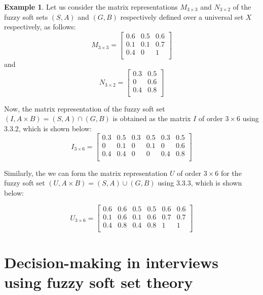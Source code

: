 \documentclass{article}
\theoremstyle{definition}
\newtheorem{example}{Example}[section]
\begin{document}
  \begin{example}
      Let us consider the matrix representations $M_{3\times 3}$ and $N_{3\times 2}$ of the fuzzy soft sets $(S,A)$ and $(G,B)$ respectively defined over a universal set $X$ respectively, as follows:
\[
    M_{3\times 3}=
    \begin{bmatrix}
        0.6 & 0.5 & 0.6 \\
          0.1 & 0.1 & 0.7 \\
           0.4 & 0 & 1 \\
     \end{bmatrix}
     \] and
     \[
    N_{3\times 2}=
    \begin{bmatrix}
        0.3 & 0.5 \\
          0 & 0.6 \\
          0.4 & 0.8 \\
     \end{bmatrix}
     \]
    
      Now, the matrix representation of the fuzzy soft set $(I,A\times B)=(S,A)\cap (G,B)$ is obtained as the matrix $I$ of order $3\times 6$ using 3.3.2, which is shown below:
 \[
    I_{3\times 6}=
    \begin{bmatrix}
        0.3 & 0.5 & 0.3 & 0.5 & 0.3 & 0.5\\
          0 & 0.1 & 0 & 0.1 & 0 & 0.6\\
          0.4 & 0.4 & 0 & 0 & 0.4 & 0.8\\
     \end{bmatrix}
     \]
      
      Similarly, the we can form the matrix representation $U$ of order $3\times 6$ for the fuzzy soft set  $(U,A\times B)=(S,A)\cup (G,B)$ using 3.3.3, which is shown below:

       \[
    U_{3\times 6}=
    \begin{bmatrix}
        0.6 & 0.6 & 0.5 & 0.5 & 0.6 & 0.6\\
          0.1 & 0.6 & 0.1 & 0.6 & 0.7 & 0.7\\
          0.4 & 0.8 & 0.4 & 0.8 & 1 & 1\\
     \end{bmatrix}
     \]
  \end{example}

\section{Decision-making in interviews using fuzzy soft set theory}
\end{document}
